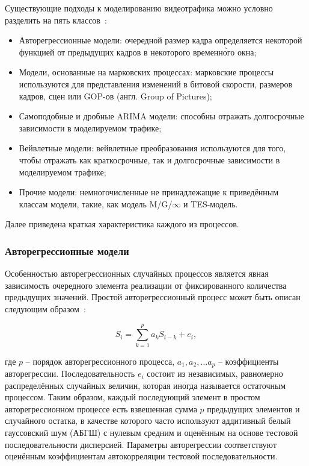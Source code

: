 Существующие подходы к моделированию видеотрафика можно условно
разделить на пять классов~\cite{survey2013}:

\begin{itemize}
    \item Авторегрессионные модели: очередной размер кадра
        определяется некоторой функцией от предыдущих кадров
        в некоторого временн\`{о}го окна;
    \item Модели, основанные на марковских процессах: марковские
        процессы используются для представления изменений
        в битовой скорости, размеров кадров, сцен или GOP-ов
        (англ. Group of Pictures);
    \item Самоподобные и дробные ARIMA модели: способны отражать
        долгосрочные зависимости в моделируемом трафике;
    \item Вейвлетные модели: вейвлетные преобразования используются
        для того, чтобы отражать как краткосрочные, так и долгосрочные
        зависимости в моделируемом трафике;
    \item Прочие модели: немногочисленные не принадлежащие к
        приведённым классам модели, такие, как модель M/G/$\infty$
        и TES-модель.
\end{itemize}
\hspace{5pt}

Далее приведена краткая характеристика каждого из процессов.

\subsubsection{Авторегрессионные модели}
\hspace{3pt}

Особенностью авторегрессионных случайных процессов является
явная зависимость очередного элемента реализации от фиксированного
количества предыдущих значений. Простой авторегрессионный процесс может
быть описан следующим образом~\cite{ars2004, survey2013}:

\begin{equation}
    S_i = \sum_{k=1}^p a_k S_{i - k} + e_i,
\end{equation}

где $p$ -- порядок авторегрессионного процесса, $a_1, a_2, \dots a_p$ -- коэффициенты
авторегрессии. Последовательность $e_i$ состоит из независимых, равномерно
распределённых случайных величин, которая иногда называется остаточным процессом.
Таким образом, каждый последующий элемент в простом авторегрессионном процессе
есть взвешенная сумма $p$ предыдущих элементов и случайного остатка, в качестве
которого часто используют аддитивный белый гауссовский шум (АБГШ) с нулевым средним
и оценённым на основе тестовой последовательности дисперсией. Параметры авторегрессии
соответствуют оценённым коэффициентам автокорреляции тестовой последовательности.

